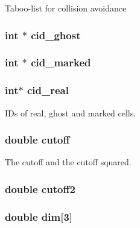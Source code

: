 Taboo-\/list for collision avoidance \hypertarget{structspace_a27fdd82c93e1319f1270cd6a84d2c245}{
\subsubsection[{cid\-\_\-ghost}]{\setlength{\rightskip}{0pt plus 5cm}int $\ast$ cid\-\_\-ghost}}\label{structspace_a27fdd82c93e1319f1270cd6a84d2c245}
\hypertarget{structspace_afb53b22e386b55484f3e4bdab0b52b48}{
\subsubsection[{cid\-\_\-marked}]{\setlength{\rightskip}{0pt plus 5cm}int $\ast$ cid\-\_\-marked}}\label{structspace_afb53b22e386b55484f3e4bdab0b52b48}
\hypertarget{structspace_a4cc50029da279d1cef5439fbf0bdc354}{
\subsubsection[{cid\-\_\-real}]{\setlength{\rightskip}{0pt plus 5cm}int$\ast$ cid\-\_\-real}}\label{structspace_a4cc50029da279d1cef5439fbf0bdc354}
I\-Ds of real, ghost and marked cells. \hypertarget{structspace_a034fbedcce0aee66ee125138543e2703}{
\subsubsection[{cutoff}]{\setlength{\rightskip}{0pt plus 5cm}double cutoff}}\label{structspace_a034fbedcce0aee66ee125138543e2703}
The cutoff and the cutoff squared. \hypertarget{structspace_ae52bffc8951344766241cba3826c70ad}{
\subsubsection[{cutoff2}]{\setlength{\rightskip}{0pt plus 5cm}double cutoff2}}\label{structspace_ae52bffc8951344766241cba3826c70ad}
\hypertarget{structspace_ac45d92a78e958d1bdbce22331b752147}{
\subsubsection[{dim}]{\setlength{\rightskip}{0pt plus 5cm}double dim\mbox{[}3\mbox{]}}}\label{structspace_ac45d92a78e958d1bdbce22331b752147}
